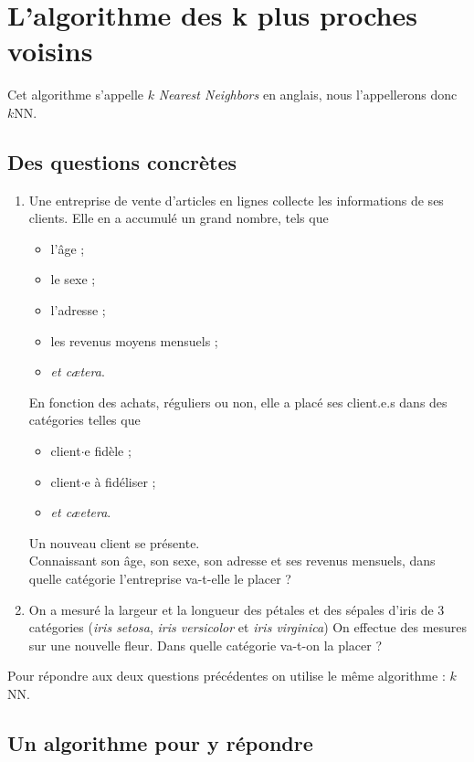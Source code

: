\chapter{L'algorithme des k plus proches voisins}
Cet algorithme s'appelle $k$ \textit{Nearest Neighbors} en anglais, nous l'appellerons donc $k$NN.

\section{Des questions concrètes}

\begin{enumerate}
    \item Une entreprise de vente d'articles en lignes collecte les informations de ses clients. Elle en a accumulé un grand nombre, tels que 
    \begin{itemize}
        \item l'âge ;
        \item le sexe ;
        \item l'adresse ;
        \item les revenus moyens mensuels ;
        \item \textit{et cætera}.
    \end{itemize}
    En fonction des achats, réguliers ou non, elle a placé ses client.e.s dans des catégories telles que
    \begin{itemize}
        \item client$\cdot$e fidèle ;
        \item client$\cdot$e à fidéliser ;
        \item \textit{et cæetera}.
    \end{itemize}
    Un nouveau client se présente.\\
    Connaissant son âge, son sexe, son adresse et ses revenus mensuels, dans quelle catégorie l'entreprise va-t-elle le placer ?

    \item On a mesuré la largeur et la longueur des pétales et des  sépales d'iris de 3 catégories (\textit{iris setosa}, \textit{iris versicolor} et \textit{iris virginica}) 
    On effectue des mesures sur une nouvelle fleur. Dans quelle catégorie va-t-on la placer ? 

\end{enumerate}

Pour répondre aux deux questions précédentes on utilise le même algorithme : $k$NN.


\section{Un algorithme pour y répondre}

